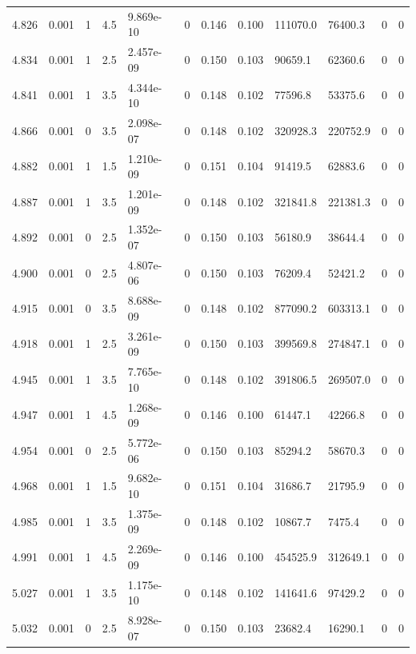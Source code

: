 \documentclass[preview]{standalone}
\begin{document}
{{{{{{{{{{{\begin{tabular}{L{1.2cm}C{1.2cm} C{0.3cm}C{0.5cm} C{1.4cm}C{1.4cm} C{1.4cm}C{1.4cm} C{1.6cm}C{1.6cm} C{1.6cm}C{1.6cm}}
  4.826  &  0.001  & 1     & 4.5 &  9.869e-10  & 0  &  0.146&   0.100& 111070.0 & 76400.3   &  0 & 0  \\ 
  4.834  &  0.001  & 1     & 2.5 &  2.457e-09  & 0  &  0.150&   0.103& 90659.1 & 62360.6   &  0 & 0  \\ 
  4.841  &  0.001  & 1     & 3.5 &  4.344e-10  & 0  &  0.148&   0.102& 77596.8 & 53375.6   &  0 & 0  \\ 
  4.866  &  0.001  & 0     & 3.5 &  2.098e-07  & 0  &  0.148&   0.102& 320928.3 & 220752.9   &  0 & 0  \\ 
  4.882  &  0.001  & 1     & 1.5 &  1.210e-09  & 0  &  0.151&   0.104& 91419.5 & 62883.6   &  0 & 0  \\ 
  4.887  &  0.001  & 1     & 3.5 &  1.201e-09  & 0  &  0.148&   0.102& 321841.8 & 221381.3   &  0 & 0  \\ 
  4.892  &  0.001  & 0     & 2.5 &  1.352e-07  & 0  &  0.150&   0.103& 56180.9 & 38644.4   &  0 & 0  \\ 
  4.900  &  0.001  & 0     & 2.5 &  4.807e-06  & 0  &  0.150&   0.103& 76209.4 & 52421.2   &  0 & 0  \\ 
  4.915  &  0.001  & 0     & 3.5 &  8.688e-09  & 0  &  0.148&   0.102& 877090.2 & 603313.1   &  0 & 0  \\ 
  4.918  &  0.001  & 1     & 2.5 &  3.261e-09  & 0  &  0.150&   0.103& 399569.8 & 274847.1   &  0 & 0  \\ 
  4.945  &  0.001  & 1     & 3.5 &  7.765e-10  & 0  &  0.148&   0.102& 391806.5 & 269507.0   &  0 & 0  \\ 
  4.947  &  0.001  & 1     & 4.5 &  1.268e-09  & 0  &  0.146&   0.100& 61447.1 & 42266.8   &  0 & 0  \\ 
  4.954  &  0.001  & 0     & 2.5 &  5.772e-06  & 0  &  0.150&   0.103& 85294.2 & 58670.3   &  0 & 0  \\ 
  4.968  &  0.001  & 1     & 1.5 &  9.682e-10  & 0  &  0.151&   0.104& 31686.7 & 21795.9   &  0 & 0  \\ 
  4.985  &  0.001  & 1     & 3.5 &  1.375e-09  & 0  &  0.148&   0.102& 10867.7 & 7475.4   &  0 & 0  \\ 
  4.991  &  0.001  & 1     & 4.5 &  2.269e-09  & 0  &  0.146&   0.100& 454525.9 & 312649.1   &  0 & 0  \\ 
  5.027  &  0.001  & 1     & 3.5 &  1.175e-10  & 0  &  0.148&   0.102& 141641.6 & 97429.2   &  0 & 0  \\ 
  5.032  &  0.001  & 0     & 2.5 &  8.928e-07  & 0  &  0.150&   0.103& 23682.4 & 16290.1   &  0 & 0  \\ 

\end{tabular}}}}}}}}}}}}
\end{document}
